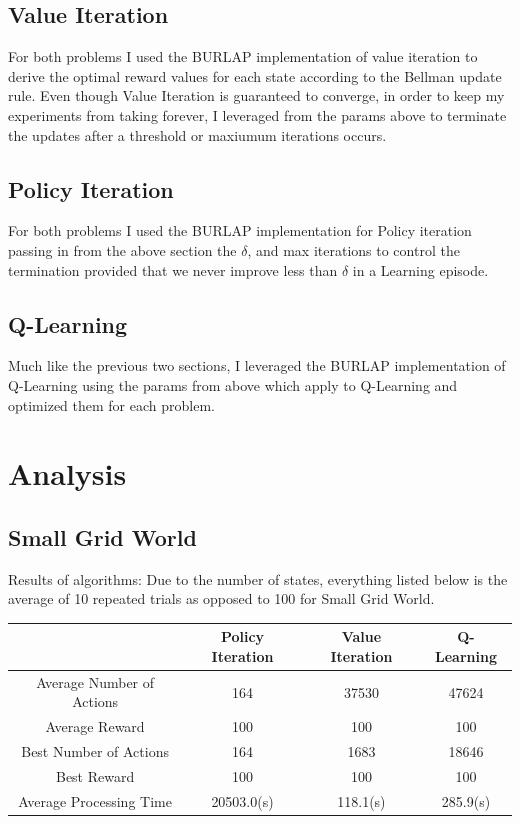 \documentclass[11pt]{article}
\newcommand{\problemone}{Small Grid World}
\begin{document}
    \subsection{Value Iteration}
    For both problems I used the BURLAP implementation of value iteration to derive the optimal reward values for each state
    according to the Bellman update rule.
    Even though Value Iteration is guaranteed to converge, in order to keep my experiments from taking forever, I leveraged
    from the params above to terminate the updates after a threshold or maxiumum iterations occurs.

    \subsection{Policy Iteration}
    For both problems I used the BURLAP implementation for Policy iteration passing in from the above section the $\delta$,
    and max iterations to control the termination provided that we never improve less than $\delta$ in a Learning episode.

    \subsection{Q-Learning}
    Much like the previous two sections, I leveraged the BURLAP implementation of Q-Learning using the params from above
    which apply to Q-Learning and optimized them for each problem.


    \section{Analysis}

    \subsection{\problemone}
    Results of algorithms:
    Due to the number of states, everything listed below is the average of 10 repeated trials as opposed to 100 for \problemone.
    \begin{center}
        \begin{tabular}{|c| c | c | c |}
            \hline
            & Policy Iteration & Value Iteration & Q-Learning \\
            \hline
            \hline
            Average Number of Actions & 164              & 37530           & 47624      \\
            \hline
            Average Reward            & 100              & 100             & 100        \\
            \hline
            Best Number of Actions    & 164              & 1683            & 18646      \\
            \hline
            Best Reward               & 100              & 100             & 100        \\
            \hline
            Average Processing Time   & 20503.0(s)       & 118.1(s)        & 285.9(s)   \\
            \hline
        \end{tabular}
    \end{center}
\end{document}
